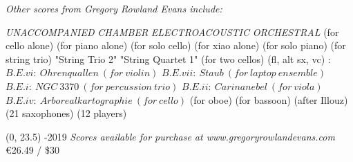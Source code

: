 \documentclass[10pt]{article}
\begin{document}

\begin{center}
\textit{\fontsize{.7cm}{1em}\selectfont Other scores from Gregory Rowland Evans include:} \hfill
\end{center}
\vspace*{4\baselineskip}
{
\begin{center}
\setlength{\columnseprule}{1pt}
\setlength{\columnsep}{6em}

\begin{paracol}{4}
\textit{\fontsize{.5cm}{1em}\selectfont UNACCOMPANIED}
\switchcolumn[1]
\textit{\fontsize{.5cm}{1em}\selectfont CHAMBER}
\switchcolumn[2]
\textit{\fontsize{.5cm}{1em}\selectfont ELECTROACOUSTIC}
\switchcolumn[3]
\textit{\fontsize{.5cm}{1em}\selectfont ORCHESTRAL}
\switchcolumn[0]
 (for cello alone)
\switchcolumn[0]
 (for piano alone)
\switchcolumn[0]
 (for solo cello)
 \switchcolumn[0]
 (for xiao alone)
  \switchcolumn[0]
 (for solo piano)
\switchcolumn[1]
\switchcolumn[1]
\switchcolumn[1]
 (for string trio)
\switchcolumn[1]
 "String Trio 2"
\switchcolumn[1]
 "String Quartet 1"
\switchcolumn[1]
 (for two cellos)
\switchcolumn[1]
 (fl, alt sx, vc)
\switchcolumn[2]
:
\switchcolumn[2]
$B.E.vi: \ Ohrenquallen \ (for \ violin)$
\switchcolumn[2]
$B.E.vii: \ Staub \ (for \ laptop \ ensemble)$
\switchcolumn[2]
$B.E.i: \ NGC \ 3370 \ (for \ percussion \ trio)$
\switchcolumn[2]
$B.E.ii: \ Carinanebel \ (for \ viola)$
\switchcolumn[2]
$B.E.iv: \ Arborealkartographie \ (for \ cello)$
\switchcolumn[2]
 (for oboe)
\switchcolumn[2]
 (for bassoon)
\switchcolumn[3]
\switchcolumn[3]
 (after Illouz)
\switchcolumn[3]
 (21 saxophones)
\switchcolumn[3]
 (12 players)


\end{paracol}
\end{center}
}

\begin{textblock}{23}(0, 23.5)
-2019 \hfill
\textit{Scores available for purchase at www.gregoryrowlandevans.com} \hfill
\euro 26.49 / \$30
\end{textblock}
\end{document}
